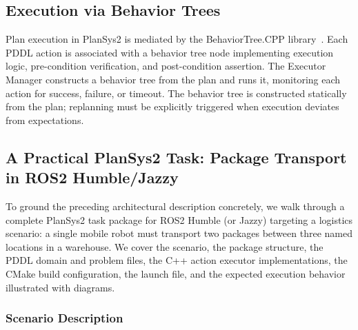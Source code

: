 \documentclass[12pt,a4paper]{article}
\theoremstyle{definition}
\theoremstyle{plain}
\begin{document}
\subsection{Execution via Behavior Trees}

Plan execution in PlanSys2 is mediated by the BehaviorTree.CPP
library~\cite{faconti2018behaviortree}. Each PDDL action is associated with a behavior tree node
implementing execution logic, pre-condition verification, and post-condition assertion. The
Executor Manager constructs a behavior tree from the plan and runs it, monitoring each action for
success, failure, or timeout. The behavior tree is constructed statically from the plan; replanning
must be explicitly triggered when execution deviates from expectations.


\subsection{A Practical PlanSys2 Task: Package Transport in ROS2 Humble/Jazzy}
\label{subsec:plansys2example}


To ground the preceding architectural description concretely, we walk through a complete
PlanSys2 task package for ROS2 Humble (or Jazzy) targeting a logistics scenario: a single mobile
robot must transport two packages between three named locations in a warehouse. We cover the
scenario, the package structure, the PDDL domain and problem files, the C++ action executor
implementations, the CMake build configuration, the launch file, and the expected execution
behavior illustrated with diagrams.

\subsubsection{Scenario Description}
\end{document}
